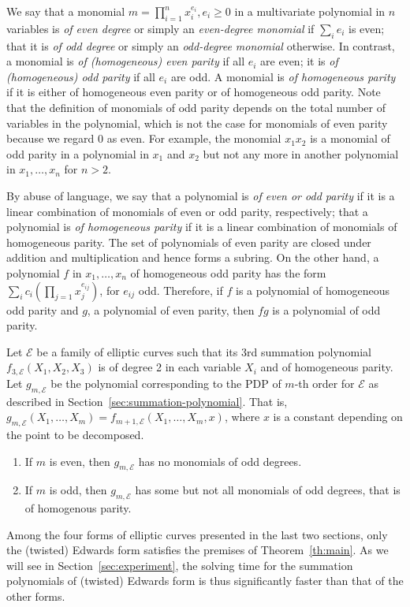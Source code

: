 We say that a monomial $m=\prod_{i=1}^n x_i^{e_i},e_i\geq 0$ in a
multivariate polynomial in $n$ variables is \emph{of even degree} or
simply an \emph{even-degree monomial} if $\sum_i e_i$ is even; that it
is \emph{of odd degree} or simply an \emph{odd-degree monomial}
otherwise.
%
In contrast, a monomial is \emph{of (homogeneous) even parity} if all
$e_i$ are even; it is \emph{of (homogeneous) odd parity} if all $e_i$
are odd.
%
A monomial is \emph{of homogeneous parity} if it is either of
homogeneous even parity or of homogeneous odd parity.
%
Note that the definition of monomials of odd parity depends on the
total number of variables in the polynomial, which is not the case for
monomials of even parity because we regard 0 as even.
%
For example, the monomial $x_1x_2$ is a monomial of odd parity in a
polynomial in $x_1$ and $x_2$ but not any more in another polynomial
in $x_1,\ldots,x_n$ for $n>2$.

By abuse of language, we say that a polynomial is \emph{of even or odd
  parity} if it is a linear combination of monomials of even or odd
parity, respectively; that a polynomial is \emph{of homogeneous
  parity} if it is a linear combination of monomials of homogeneous
parity.
%
The set of polynomials of even parity are closed under addition and
multiplication and hence forms a subring.
%
On the other hand, a polynomial $f$ in $x_1,\ldots,x_n$ of homogeneous
odd parity has the form
$\sum_i c_i\left(\prod_{j=1} x_j^{e_{ij}}\right)$, for $e_{ij}$ odd.
%
Therefore, if $f$ is a polynomial of homogeneous odd parity and $g$, a
polynomial of even parity, then $fg$ is a polynomial of odd parity.

\begin{theorem}
  \label{th:main}
  Let $\mathcal E$ be a family of elliptic curves such that its 3rd
  summation polynomial $f_{3,\mathcal E}(X_1,X_2,X_3)$ is of degree 2
  in each variable $X_i$ and of homogeneous parity.
  Let $g_{m,\mathcal E}$ be the polynomial corresponding to the PDP of
  $m$-th order for $\mathcal E$ as described in
  Section~\ref{sec:summation-polynomial}.
  That is,
  $g_{m,\mathcal E}(X_1,\ldots,X_m)=f_{m+1,\mathcal
    E}(X_1,\ldots,X_m,x)$, where $x$ is a constant depending on the
  point to be decomposed.
  \begin{enumerate}
  \item If $m$ is even, then $g_{m,\mathcal E}$ has no monomials of
    odd degrees.
  \item If $m$ is odd, then $g_{m,\mathcal E}$ has some but not all
    monomials of odd degrees, that is of homogenous parity.
  \end{enumerate}
\end{theorem}
%
Among the four forms of elliptic curves presented in the last two
sections, only the (twisted) Edwards form satisfies the premises of
Theorem~\ref{th:main}.
%
As we will see in Section~\ref{sec:experiment}, the solving time for
the summation polynomials of (twisted) Edwards form is thus
significantly faster than that of the other forms.

